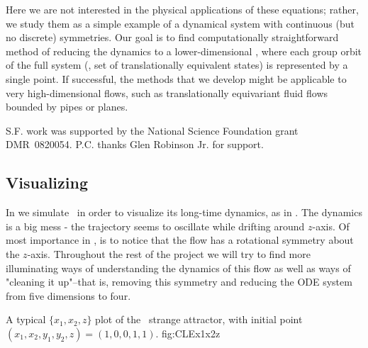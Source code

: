 Here we are not interested in the physical applications of
these equations; rather, we study them as a simple example of
a dynamical system with continuous (but no discrete)
symmetries. Our goal is to find computationally
straightforward method of reducing the dynamics to a
lower-dimensional \statesp, where each group orbit of the
full system (\ie, set of translationally equivalent states)
is represented by a single point. If successful, the methods
that we develop might be applicable to very high-dimensional
flows, such as translationally equivariant fluid flows
bounded by pipes or planes.

S.F. work was supported by the National Science Foundation
grant DMR~0820054.
P.C. thanks Glen Robinson Jr. for support.

\subsection{Visualizing \cLf}

In  we simulate \cLf\ in order to
visualize its long-time dynamics, as in
. The dynamics is a big mess - the
trajectory seems to oscillate while drifting around $z$-axis.
Of most importance in , is to notice
that the flow has a rotational symmetry about the $z$-axis.
Throughout the rest of the project we will try to find more
illuminating ways of understanding the dynamics of this flow
as well as ways of "cleaning it up"--that is, removing this
symmetry and reducing the ODE system from five dimensions to
four.

{}{
A typical $\{x_1,x_2,z\}$ plot of the \cLf\ strange attractor,
with initial point
$(x_1, x_2, y_1, y_2, z) = (1, 0, 0, 1, 1)$.
    }{fig:CLEx1x2z}


